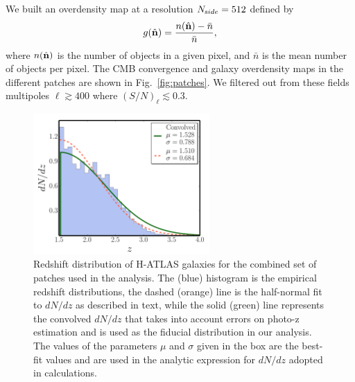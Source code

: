 We built an overdensity map at a resolution $N_{\rm side}=512$ defined by
%
\begin{equation}
\label{eqn:counttodensity}
g(\nver) = \frac{n(\nver)-\bar{n}}{\bar{n}},
\end{equation}
%
where $n(\nver)$ is the number of objects in a given pixel, and $\bar{n}$ is the mean number of objects per pixel. The \gls{CMB} convergence and galaxy overdensity maps in the different patches are shown in Fig.~\eqref{fig:patches}. We filtered out from these fields multipoles $\ell \gtrsim 400$ where $(S/N)_{\ell}\lesssim 0.3$.

\begin{figure} %
\centering %
\includegraphics[width=0.6\textwidth]{Chapter3/Images/f4}
\caption{Redshift distribution of H-ATLAS galaxies for the combined set of patches used in the analysis. The (blue) histogram  is the empirical redshift distributions, the dashed (orange) line is the half-normal fit to $dN/dz$ as described in text, while the solid (green) line represents the convolved $dN/dz$ that takes into account errors on photo-z estimation and is used as the fiducial distribution in our analysis. The values of the parameters $\mu$ and $\sigma$ given in the box are the best-fit values and are used in the analytic expression for $dN/dz$ adopted in calculations. \label{fig:dndzxc1}}
\end{figure}

